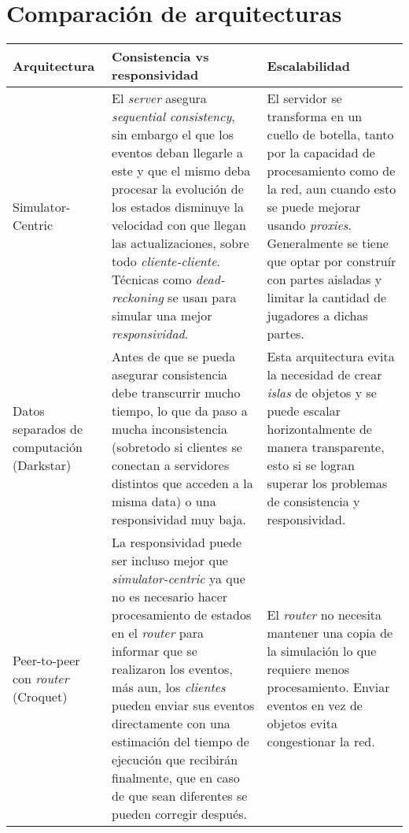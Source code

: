 \section{Comparación de arquitecturas}

%

\small
\begin{longtable}{|p{3cm}|p{6cm}|p{6cm}|}
\hline
\textbf{Arquitectura} & \textbf{Consistencia vs responsividad} & \textbf{Escalabilidad} \\ \hline
Simulator-Centric &
El \emph{server} asegura \emph{sequential consistency}, sin embargo el que los eventos deban llegarle a este y que el mismo deba procesar la evolución de los estados disminuye la velocidad con que llegan las actualizaciones, sobre todo \emph{cliente-cliente}. Técnicas como \emph{dead-reckoning} se usan para simular una mejor \emph{responsividad}. &
El servidor se transforma en un cuello de botella, tanto por la capacidad de procesamiento como de la red, aun cuando esto se puede mejorar usando \emph{proxies}. Generalmente se tiene que optar por construír con partes aisladas y limitar la cantidad de jugadores a dichas partes. \\
\hline
Datos separados de computación (Darkstar) &
Antes de que se pueda asegurar consistencia debe transcurrir mucho tiempo, lo que da paso a mucha inconsistencia (sobretodo si clientes se conectan a servidores distintos que acceden a la misma data) o una responsividad muy baja. &
Esta arquitectura evita la necesidad de crear \emph{islas} de objetos y se puede escalar horizontalmente de manera transparente, esto si se logran superar los problemas de consistencia y responsividad. \\
\hline
Peer-to-peer con \emph{router} (Croquet) &
La responsividad puede ser incluso mejor que \emph{simulator-centric} ya que no es necesario hacer procesamiento de estados en el \emph{router} para informar que se realizaron los eventos, más aun, los \emph{clientes} pueden enviar sus eventos directamente con una estimación del tiempo de ejecución que recibirán finalmente, que en caso de que sean diferentes se pueden corregir después. &
El \emph{router} no necesita mantener una copia de la simulación lo que requiere menos procesamiento. \newline
Enviar eventos en vez de objetos evita congestionar la red. \newline

\end{longtable}

